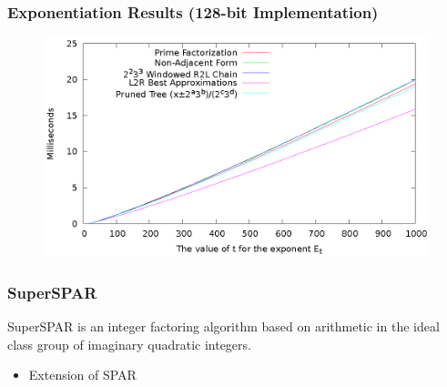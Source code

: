 \documentclass{beamer}
\begin{document}
\begin{frame}
\frametitle{Exponentiation Results (128-bit Implementation)}

\begin{figure}
\includegraphics[scale=0.86]{winners-128}
\end{figure}

\end{frame}

\begin{frame}
\frametitle{SuperSPAR}

SuperSPAR is an integer factoring algorithm based on arithmetic in the ideal class group of imaginary quadratic integers.
\begin{itemize}
\item Extension of SPAR 
\end{itemize}

\end{frame}
\end{document}
